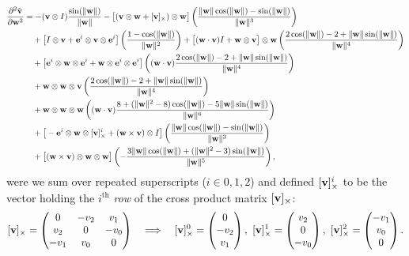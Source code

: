 \documentclass[10pt]{article}
\providecommand{\norm}[1]{\lVert#1\rVert}
\providecommand{\cross}{\times}
\renewcommand{\vec}[1]{{\bf #1}}
\def\w{\vec{w}}
\def\wn{\norm{\w}}
\def\v{\vec{v}}
\def\e{\vec{e}}
\begin{document}
\begin{align*}
\frac{\partial^2 \tilde{\v}}{\partial \w^2}
&=
    -(\v \otimes I)  \frac{\sin(\wn)}{\wn}
    - \big[(\v \otimes \w + [\v]_\cross) \otimes \w\big] \left(\frac{\wn \cos(\wn) - \sin(\wn)}{\wn^3}\right)
\\ &\quad
    + \big[ I \otimes \v + \e^i \otimes \v \otimes \e^i \big] \left(\frac{1 - \cos(\wn)}{\wn^2}\right)
    + \big[ (\w \cdot \v) I + \w \otimes \v \big] \otimes \w \left(\frac{2 \cos(\wn) - 2 + \wn \sin(\wn)}{\wn^4}\right)
\\ &\quad
    + \big[\e^i \otimes \w \otimes \e^i + \w \otimes \e^i \otimes \e^i\big] \left((\w \cdot \v) \frac{2 \cos(\wn) - 2 + \wn \sin(\wn)}{\wn^4}\right)
\\ &\quad
    + \w \otimes \w \otimes \v \left(\frac{2 \cos(\wn) - 2 + \wn \sin(\wn)}{\wn^4}\right)
\\ &\quad
    + \w \otimes \w \otimes \w \left((\w \cdot \v) \frac{8 + (\wn^2 - 8) \cos(\wn) - 5 \wn \sin(\wn)}{\wn^6}\right)
\\ &\quad
    + \big[-\e^i \otimes \w \otimes [\v]_\cross^i + (\w\cross\v) \otimes I \big] \left(\frac{\wn \cos(\wn) - \sin(\wn)}{\wn^3}\right)
\\ &\quad
    + \big[(\w \cross \v) \otimes \w \otimes \w\big]\left(-\frac{3 \wn \cos(\wn) + (\wn^2 - 3) \sin(\wn)}{\wn^5}\right),
\end{align*}
were we sum over repeated superscripts ($i \in {0, 1, 2}$) and defined $[\v]_\cross^i$ to be the vector holding the $i^\text{th}$
\emph{row} of the cross product matrix $[\v]_\cross$:
$$
[\v]_\cross =
\begin{pmatrix}
0 & -v_2 & v_1 \\
v_2 & 0 & -v_0 \\
-v_1 & v_0 & 0 \\
\end{pmatrix}
\quad \Longrightarrow \quad
[\v]_\cross^0 = \begin{pmatrix} 0 \\ -v_2 \\ v_1 \end{pmatrix},\,\,
[\v]_\cross^1 = \begin{pmatrix} v_2 \\ 0 \\ -v_0 \end{pmatrix},\,\,
[\v]_\cross^2 = \begin{pmatrix} -v_1 \\ v_0 \\ 0 \end{pmatrix}.
$$
\end{document}
